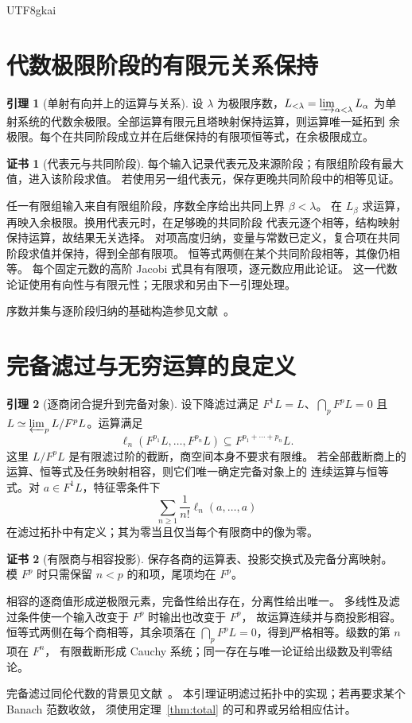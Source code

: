 \documentclass[12pt]{report}
\makeatletter
\theoremstyle{definition}
\newtheorem{lemma}{引理}[chapter]
\newtheorem{Certificate}{证书}[chapter]
\renewenvironment{proof}[1][\proofname]{\par
  \pushQED{\qed}\normalfont
  \topsep6\p@\@plus6\p@\relax
  \trivlist
  \item[\hskip\labelsep\normalfont #1\@addpunct{.}]\ignorespaces
}{
  \popQED\endtrivlist\@endpefalse
}
\makeatother
\begin{document}
\begin{CJK*}{UTF8}{gkai}
\section{代数极限阶段的有限元关系保持}
\begin{lemma}[单射有向并上的运算与关系]
\label{lem:ordinal-colimit}
设 \(\lambda\) 为极限序数，\(L_{<\lambda}=\varinjlim_{\alpha<\lambda}L_\alpha\)
为单射系统的代数余极限。全部运算有限元且塔映射保持运算，则运算唯一延拓到
余极限。每个在共同阶段成立并在后继保持的有限项恒等式，在余极限成立。
\end{lemma}
\begin{Certificate}[代表元与共同阶段]
每个输入记录代表元及来源阶段；有限组阶段有最大值，进入该阶段求值。
若使用另一组代表元，保存更晚共同阶段中的相等见证。
\end{Certificate}
\begin{proof}
任一有限组输入来自有限组阶段，序数全序给出共同上界 \(\beta<\lambda\)。
在 \(L_\beta\) 求运算，再映入余极限。换用代表元时，在足够晚的共同阶段
代表元逐个相等，结构映射保持运算，故结果无关选择。
对项高度归纳，变量与常数已定义，复合项在共同阶段求值并保持，得到全部有限项。
恒等式两侧在某个共同阶段相等，其像仍相等。
每个固定元数的高阶 Jacobi 式具有有限项，逐元数应用此论证。
这一代数论证使用有向性与有限元性；无限求和另由下一引理处理。
\end{proof}
序数并集与逐阶段归纳的基础构造参见文献~\cite{stacksordinal}。

\section{完备滤过与无穷运算的良定义}
\begin{lemma}[逐商闭合提升到完备对象]
\label{lem:filtered-completion}
设下降滤过满足 \(F^1L=L\)、\(\bigcap_pF^pL=0\) 且
\(L\simeq\varprojlim_p L/F^pL\)。运算满足
\[
\ell_n(F^{p_1}L,\ldots,F^{p_n}L)
\subseteq F^{p_1+\cdots+p_n}L.
\]
这里 \(L/F^pL\) 是有限滤过阶的截断，商空间本身不要求有限维。
若全部截断商上的运算、恒等式及任务映射相容，则它们唯一确定完备对象上的
连续运算与恒等式。对 \(a\in F^1L\)，特征零条件下
\[
\sum_{n\ge1}\frac1{n!}\ell_n(a,\ldots,a)
\]
在滤过拓扑中有定义；其为零当且仅当每个有限商中的像为零。
\end{lemma}
\begin{Certificate}[有限商与相容投影]
保存各商的运算表、投影交换式及完备分离映射。
模 \(F^p\) 时只需保留 \(n<p\) 的和项，尾项均在 \(F^p\)。
\end{Certificate}
\begin{proof}
相容的逐商值形成逆极限元素，完备性给出存在，分离性给出唯一。
多线性及滤过条件使一个输入改变于 \(F^p\) 时输出也改变于 \(F^p\)，
故运算连续并与商投影相容。恒等式两侧在每个商相等，其余项落在
\(\bigcap_pF^pL=0\)，得到严格相等。级数的第 \(n\) 项在 \(F^n\)，
有限截断形成 Cauchy 系统；同一存在与唯一论证给出级数及判零结论。
\end{proof}
完备滤过同伦代数的背景见文献~\cite{dolgushevrogers}。
本引理证明滤过拓扑中的实现；若再要求某个 Banach 范数收敛，
须使用定理~\ref{thm:total} 的可和界或另给相应估计。


\end{CJK*}
\end{document}
